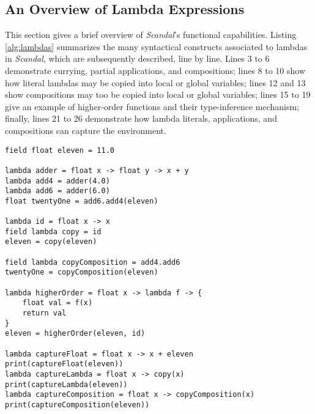 \subsection{An Overview of Lambda Expressions}

This section gives a brief overview of \emph{Scandal}'s functional capabilities. Listing \ref{alg:lambdas} summarizes the many syntactical constructs associated to lambdas in \emph{Scandal}, which are subsequently described, line by line. Lines 3 to 6 demonstrate currying, partial applications, and compositions; lines 8 to 10 show how literal lambdas may be copied into local or global variables; lines 12 and 13 show compositions may too be copied into local or global variables; lines 15 to 19 give an example of higher-order functions and their type-inference mechanism; finally, lines 21 to 26 demonstrate how lambda literals, applications, and compositions can capture the environment. 

\begin{lstlisting}[emph={field,float,lambda},emphstyle={\textbf},caption={The syntax of lambda expressions in \emph{Scandal}.},label={alg:lambdas}]
field float eleven = 11.0

lambda adder = float x -> float y -> x + y
lambda add4 = adder(4.0)
lambda add6 = adder(6.0)
float twentyOne = add6.add4(eleven)

lambda id = float x -> x
field lambda copy = id
eleven = copy(eleven)

field lambda copyComposition = add4.add6
twentyOne = copyComposition(eleven)

lambda higherOrder = float x -> lambda f -> {
	float val = f(x)
	return val
}
eleven = higherOrder(eleven, id)

lambda captureFloat = float x -> x + eleven
print(captureFloat(eleven))
lambda captureLambda = float x -> copy(x)
print(captureLambda(eleven))
lambda captureComposition = float x -> copyComposition(x)
print(captureComposition(eleven))
\end{lstlisting}

